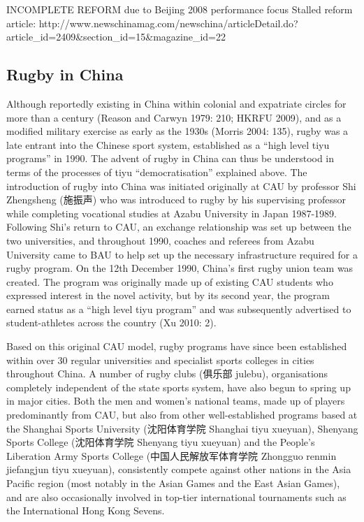 INCOMPLETE REFORM due to Beijing 2008 performance focus
Stalled reform article: http://www.newschinamag.com/newschina/articleDetail.do?article_id=2409&section_id=15&magazine_id=22


\subsection{Rugby in China}
Although reportedly existing in China within colonial and expatriate circles for more than a century (Reason and Carwyn 1979: 210; HKRFU 2009), and as a modified military exercise as early as the 1930s (Morris 2004: 135), rugby was a late entrant into the Chinese sport system, established as a “high level tiyu programs” in 1990.  The advent of rugby in China can thus be understood in terms of the processes of tiyu “democratisation” explained above.  The introduction of rugby into China was initiated originally at CAU by professor Shi Zhengsheng (施振声) who was introduced to rugby by his supervising professor while completing vocational studies at Azabu University in Japan 1987-1989.  Following Shi’s return to CAU, an exchange relationship was set up between the two universities, and throughout 1990, coaches and referees from Azabu University came to BAU to help set up the necessary infrastructure required for a rugby program.  On the 12th December 1990, China’s first rugby union team was created.  The program was originally made up of existing CAU students who expressed interest in the novel activity, but by its second year, the program earned status as a “high level tiyu program” and was subsequently advertised to student-athletes across the country (Xu 2010: 2).

Based on this original CAU model, rugby programs have since been established within over 30 regular universities and specialist sports colleges in cities throughout China.  A number of rugby clubs (俱乐部 julebu), organisations completely independent of the state sports system, have also begun to spring up in major cities.  Both the men and women’s national teams, made up of players predominantly from CAU, but also from other well-established programs based at the Shanghai Sports University (沈阳体育学院 Shanghai tiyu xueyuan), Shenyang Sports College (沈阳体育学院 Shenyang tiyu xueyuan) and the People’s Liberation Army Sports College (中国人民解放军体育学院 Zhongguo renmin jiefangjun tiyu xueyuan), consistently compete against other nations in the Asia Pacific region (most notably in the Asian Games and the East Asian Games), and are also occasionally involved in top-tier international tournaments such as the International Hong Kong Sevens.

